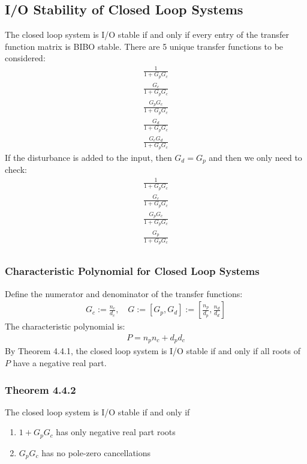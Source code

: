 \documentclass[letterpaper,12pt]{article}
\begin{document}
\subsection{I/O Stability of Closed Loop Systems}
The closed loop system is I/O stable if and only if every entry of the transfer function matrix is BIBO stable. There are 
5 unique transfer functions to be considered:
\begin{align*}
    \frac{1}{1+G_p G_c} \\
    \frac{G_c}{1+G_p G_c} \\
    \frac{G_p G_c}{1+G_p G_c} \\
    \frac{G_d}{1+G_p G_c} \\
    \frac{G_c G_d}{1+G_p G_c} 
\end{align*}
If the disturbance is added to the input, then $G_d = G_p$ and then we only need to check:
\begin{align*}
    \frac{1}{1+G_p G_c} \\
    \frac{G_c}{1+G_p G_c} \\
    \frac{G_p G_c}{1+G_p G_c} \\
    \frac{G_p}{1+G_p G_c} \\
\end{align*}
\subsubsection{Characteristic Polynomial for Closed Loop Systems}
Define the numerator and denominator of the transfer functions:
\begin{align*}
    G_c := \frac{n_c}{d_c}, \quad G := [G_p, G_d] := [\frac{n_p}{d_p}, \frac{n_d}{d_d}]
\end{align*}
The characteristic polynomial is:
\begin{align*}
    P = n_p n_c + d_p d_c
\end{align*}
By Theorem 4.4.1, the closed loop system is I/O stable if and only if all roots of $P$ have a negative real part.

\subsubsection{Theorem 4.4.2}
The closed loop system is I/O stable if and only if
\begin{enumerate}
    \item $1 + G_p G_c$ has only negative real part roots
    \item $G_p G_c$ has no pole-zero cancellations
\end{enumerate}
\end{document}
